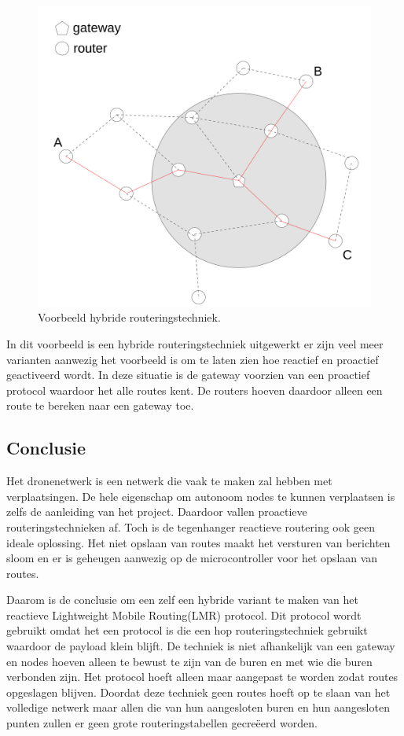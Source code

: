 \documentclass[a4paper, 11pt, oneside]{report}
\begin{document}
\begin{figure}[H]
	\begin{center}\includegraphics[width=0.45\linewidth]{Afbeeldingen/hybride.png}\end{center}
	\caption{Voorbeeld hybride routeringstechniek.}
	\label{fig:hybride}
\end{figure}

In dit voorbeeld is een hybride routeringstechniek uitgewerkt er zijn veel meer varianten aanwezig het voorbeeld is om te laten zien hoe reactief en proactief geactiveerd wordt.
In deze situatie is de gateway voorzien van een proactief protocol waardoor het alle routes kent. 
De routers hoeven daardoor alleen een route te bereken naar een gateway toe.   
  
\subsection{Conclusie}
\label{sec:meshnetwerktechniek:Conlusie}
Het dronenetwerk is een netwerk die vaak te maken zal hebben met verplaatsingen.
De hele eigenschap om autonoom nodes te kunnen verplaatsen is zelfs de aanleiding van het project.
Daardoor vallen proactieve routeringstechnieken af. 
Toch is de tegenhanger reactieve routering ook geen ideale oplossing.
Het niet opslaan van routes maakt het versturen van berichten sloom en er is geheugen aanwezig op de microcontroller voor het opslaan van routes. 

Daarom is de conclusie om een zelf een hybride variant te maken van het reactieve Lightweight Mobile Routing(LMR) protocol.
Dit protocol wordt gebruikt omdat het een protocol is die een hop routeringstechniek gebruikt waardoor de payload klein blijft.
De techniek is niet afhankelijk van een gateway en nodes hoeven alleen te bewust te zijn van de buren en met wie die buren verbonden zijn.
Het protocol hoeft alleen maar aangepast te worden zodat routes opgeslagen blijven.
Doordat deze techniek geen routes hoeft op te slaan van het volledige netwerk  maar allen die van hun aangesloten buren en hun aangesloten punten zullen er geen grote routeringstabellen gecreëerd worden.
\end{document}
